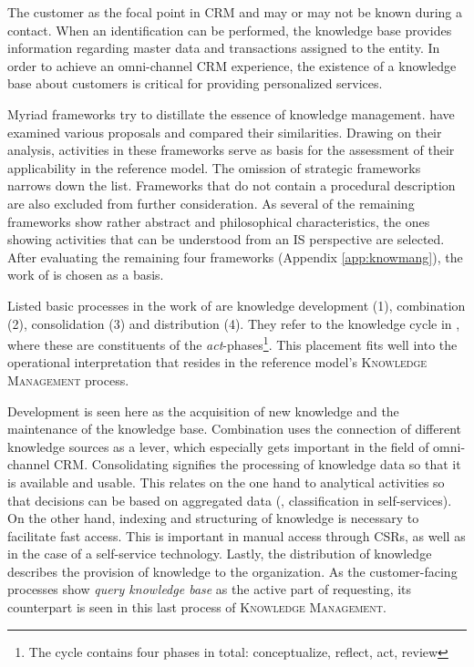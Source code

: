 The customer as the focal point in \acrshort{CRM} and may or may not be known during a contact. When an identification can be performed, the knowledge base provides information regarding master data and transactions assigned to the entity. In order to achieve an omni-channel \acrshort{CRM} experience, the existence of a knowledge base about customers is critical for providing personalized services. 

Myriad frameworks try to distillate the essence of knowledge management. \cite{Rubenstein_Montano_2001} have examined various proposals and compared their similarities. Drawing on their analysis, activities in these frameworks serve as basis for the assessment of their applicability in the reference model. The omission of strategic frameworks narrows down the list. Frameworks that do not contain a procedural description are also excluded from further consideration. As several of the remaining frameworks show rather abstract and philosophical characteristics, the ones showing activities that can be understood from an \acrshort{IS} perspective are selected. After evaluating the remaining four frameworks (\cf Appendix \ref{app:knowmang}), the work of \cite{van_Heijst_1997} is chosen as a basis.

Listed basic processes in the work of \citeauthor{van_Heijst_1997} are knowledge development (1), combination (2), consolidation (3) and distribution (4). They refer to the knowledge cycle in \citep{Wiig_1997}, where these are constituents of the \textit{act}-phases\footnote{The cycle contains four phases in total: conceptualize, reflect, act, review}. This placement fits well into the operational interpretation that resides in the reference model's \textsc{Knowledge Management} process.

Development is seen here as the acquisition of new knowledge  \citep{van_Heijst_1997} and the maintenance of the knowledge base. Combination uses the connection of different knowledge sources as a lever, which especially gets important in the field of omni-channel \acrshort{CRM}. Consolidating signifies the processing of knowledge data so that it is available and usable. This relates on the one hand to analytical activities so that decisions can be based on aggregated data (\eg, classification in self-services). On the other hand, indexing and structuring of knowledge is necessary to facilitate fast access. This is important in manual access through \acrshort{CSR}s, as well as in the case of a self-service technology. Lastly, the distribution of knowledge describes the provision of knowledge to the organization. As the customer-facing processes show \textit{query knowledge base} as the active part of requesting, its counterpart is seen in this last process of \textsc{Knowledge Management}. 

